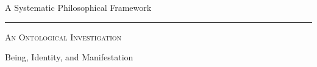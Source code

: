\begin{titlepage}

\thispagestyle{empty}

\begin{center}

\vspace*{1.8cm}



{\large
\textsc{\SystemName}
}

\vspace{0.35cm}

{\normalsize
A Systematic Philosophical Framework
}


\vspace{1.7cm}



{\Large
\textsc{\BookNumber}
}

\vspace{0.9cm}



{\Huge
\bfseries
\BookTitle
}

\vspace{0.9cm}

\rule{0.68\textwidth}{0.8pt}

\vspace{0.9cm}



{\large
\textsc{An Ontological Investigation}
}

\vspace{0.35cm}

{\normalsize
Being, Identity, and Manifestation
}


\vfill




\end{center}
\end{titlepage}
